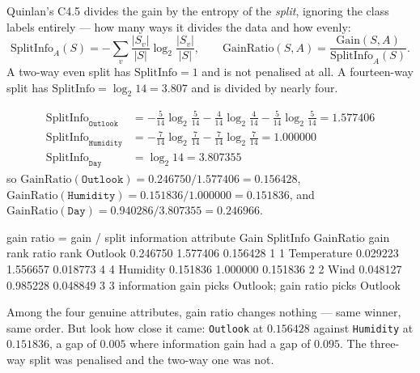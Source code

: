 \documentclass[11pt]{article}
\begin{document}
Quinlan's C4.5 divides the gain by the entropy of the \emph{split}, ignoring
the class labels entirely --- how many ways it divides the data and how
evenly:
\begin{equation}
  \label{eq:splitinfo}
  \mathrm{SplitInfo}_A(S) = -\sum_{v}\frac{|S_v|}{|S|}
     \log_2 \frac{|S_v|}{|S|},
  \qquad
  \mathrm{GainRatio}(S,A) = \frac{\mathrm{Gain}(S,A)}
                                 {\mathrm{SplitInfo}_A(S)} .
\end{equation}
A two-way even split has $\mathrm{SplitInfo} = 1$ and is not penalised at all.
A fourteen-way split has $\mathrm{SplitInfo} = \log_2 14 = 3.807$ and is
divided by nearly four.

\begin{worked}
\begin{align*}
  \mathrm{SplitInfo}_{\texttt{Outlook}}
   &= -\tfrac{5}{14}\log_2\tfrac{5}{14} - \tfrac{4}{14}\log_2\tfrac{4}{14}
      - \tfrac{5}{14}\log_2\tfrac{5}{14} = 1.577406 \\
  \mathrm{SplitInfo}_{\texttt{Humidity}}
   &= -\tfrac{7}{14}\log_2\tfrac{7}{14} - \tfrac{7}{14}\log_2\tfrac{7}{14}
      = 1.000000 \\
  \mathrm{SplitInfo}_{\texttt{Day}} &= \log_2 14 = 3.807355
\end{align*}
so
$\mathrm{GainRatio}(\texttt{Outlook}) = 0.246750/1.577406 = 0.156428$,
$\mathrm{GainRatio}(\texttt{Humidity}) = 0.151836/1.000000 = 0.151836$,
and $\mathrm{GainRatio}(\texttt{Day}) = 0.940286/3.807355 = 0.246966$.
\end{worked}

\begin{codeout}
gain ratio = gain / split information
attribute      Gain      SplitInfo   GainRatio   gain rank  ratio rank
Outlook       0.246750   1.577406    0.156428      1          1
Temperature   0.029223   1.556657    0.018773      4          4
Humidity      0.151836   1.000000    0.151836      2          2
Wind          0.048127   0.985228    0.048849      3          3
information gain picks Outlook; gain ratio picks Outlook
\end{codeout}

Among the four genuine attributes, gain ratio changes nothing --- same winner,
same order. But look how close it came: \texttt{Outlook} at $0.156428$ against
\texttt{Humidity} at $0.151836$, a gap of $0.005$ where information gain had a
gap of $0.095$. The three-way split was penalised and the two-way one was not.
\end{document}
